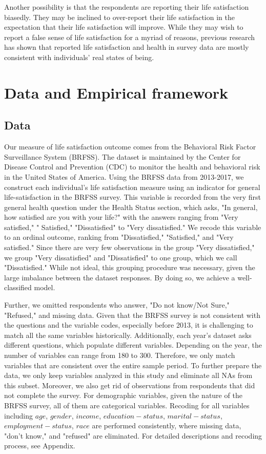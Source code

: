\documentclass[11pt,a4paper,oldfontcommands]{memoir}
\begin{document}
{Another possibility is that the respondents are reporting their life satisfaction biasedly. They may be inclined to over-report their life satisfaction in the expectation that their life satisfaction will improve. While they may wish to report a false sense of life satisfaction for a myriad of reasons, previous research has shown that reported life satisfaction and health in survey data are mostly consistent with individuals' real states of being. 

\section{Data and Empirical framework}

\subsection{Data}

Our measure of life satisfaction outcome comes from the Behavioral Risk Factor Surveillance System (BRFSS). The dataset is maintained by the Center for Disease Control and Prevention (CDC) to monitor the health and behavioral risk in the United States of America. Using the BRFSS data from 2013-2017, we construct each individual's life satisfaction measure using an indicator for general life-satisfaction in the BRFSS survey. This variable is recorded from the very first general health question under the Health Status section, which asks, "In general, how satisfied are you with your life?" with the answers ranging from "Very satisfied," " Satisfied," "Dissatisfied" to "Very dissatisfied." We recode this variable to an ordinal outcome, ranking from "Dissatisfied," "Satisfied," and "Very satisfied."  Since there are very few observations in the group "Very dissatisfied," we group "Very dissatisfied" and "Dissatisfied" to one group, which we call "Dissatisfied." While not ideal, this grouping procedure was necessary, given the large imbalance between the dataset responses. By doing so, we achieve a well-classified model.

Further, we omitted respondents who answer, "Do not know/Not Sure," "Refused," and missing data. Given that the BRFSS survey is not consistent with the questions and the variable codes, especially before 2013, it is challenging to match all the same variables historically. Additionally, each year's dataset asks different questions, which populate different variables. Depending on the year, the number of variables can range from 180 to 300. Therefore, we only match variables that are consistent over the entire sample period. To further prepare the data, we only keep variables analyzed in this study and eliminate all NAs from this subset. Moreover, we also get rid of observations from respondents that did not complete the survey. For demographic variables, given the nature of the BRFSS survey, all of them are categorical variables. Recoding for all variables including  $age$, $gender$, $income$, $education-status$, $marital-status$, $employment-status$, $race$ are performed consistently, where missing data, "don't know," and "refused" are eliminated. For detailed descriptions and recoding process, see Appendix.

}
\end{document}
